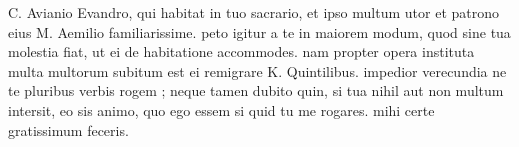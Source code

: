 


 C. Avianio Evandro, qui habitat in tuo sacrario, et ipso multum utor et patrono eius M. Aemilio familiarissime. peto igitur a te in maiorem modum, quod sine tua molestia fiat, ut ei de habitatione accommodes. nam propter opera instituta multa multorum subitum est ei remigrare K. Quintilibus. impedior verecundia ne te pluribus verbis rogem ; neque tamen dubito quin, si tua nihil aut non multum intersit, eo sis animo, quo ego essem si quid tu me rogares. mihi certe gratissimum feceris.
